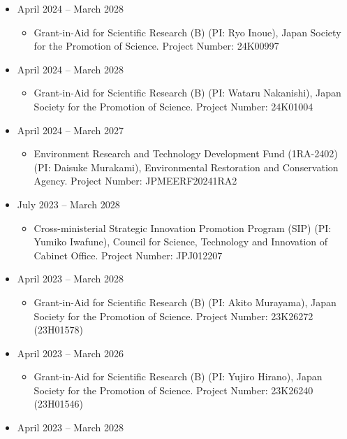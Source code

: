 \documentclass[
]{book}
\providecommand{\tightlist}{%
  \setlength{\itemsep}{0pt}\setlength{\parskip}{0pt}}
\begin{document}
\begin{itemize}
\tightlist
\item
  April 2024 -- March 2028

  \begin{itemize}
  \tightlist
  \item
    Grant-in-Aid for Scientific Research (B) (PI: Ryo Inoue),
    Japan Society for the Promotion of Science.
    Project Number: 24K00997
  \end{itemize}
\item
  April 2024 -- March 2028

  \begin{itemize}
  \tightlist
  \item
    Grant-in-Aid for Scientific Research (B) (PI: Wataru Nakanishi),
    Japan Society for the Promotion of Science.
    Project Number: 24K01004
  \end{itemize}
\item
  April 2024 -- March 2027

  \begin{itemize}
  \tightlist
  \item
    Environment Research and Technology Development Fund (1RA-2402) (PI: Daisuke Murakami),
    Environmental Restoration and Conservation Agency.
    Project Number: JPMEERF20241RA2
  \end{itemize}
\item
  July 2023 -- March 2028

  \begin{itemize}
  \tightlist
  \item
    Cross-ministerial Strategic Innovation Promotion Program (SIP) (PI: Yumiko Iwafune),
    Council for Science, Technology and Innovation of Cabinet Office.
    Project Number: JPJ012207
  \end{itemize}
\item
  April 2023 -- March 2028

  \begin{itemize}
  \tightlist
  \item
    Grant-in-Aid for Scientific Research (B) (PI: Akito Murayama),
    Japan Society for the Promotion of Science.
    Project Number: 23K26272 (23H01578)
  \end{itemize}
\item
  April 2023 -- March 2026

  \begin{itemize}
  \tightlist
  \item
    Grant-in-Aid for Scientific Research (B) (PI: Yujiro Hirano),
    Japan Society for the Promotion of Science.
    Project Number: 23K26240 (23H01546)
  \end{itemize}
\item
  April 2023 -- March 2028


\end{itemize}
\end{document}
